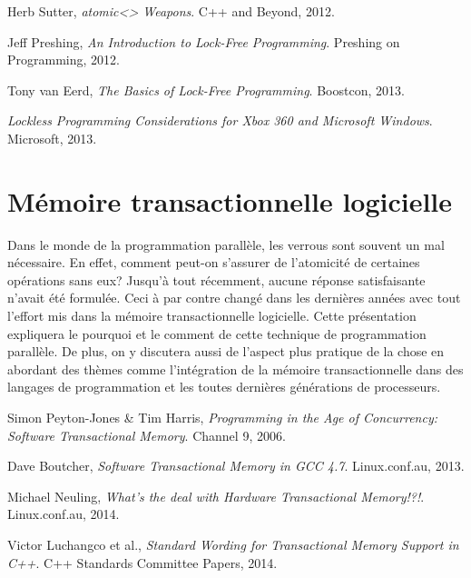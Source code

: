 \documentclass{article}
\begin{document}
\renewcommand\refname{Références LockFree}
\begin{thebibliography}{9}
          Herb Sutter,
          \emph{atomic<> Weapons}.
          C++ and Beyond, 2012.
          
          Jeff Preshing,
          \emph{An Introduction to Lock-Free Programming}.
          Preshing on Programming, 2012.
          
          Tony van Eerd,
          \emph{The Basics of Lock-Free Programming}.
          Boostcon, 2013.
          
          \emph{Lockless Programming Considerations for Xbox 360 and Microsoft Windows}.
          Microsoft, 2013.
\end{thebibliography}

\newpage

\section*{Mémoire transactionnelle logicielle}
Dans le monde de la programmation parallèle, les verrous sont souvent un mal nécessaire. En effet, comment peut-on s'assurer de l'atomicité de certaines opérations sans eux? Jusqu'à tout récemment, aucune réponse satisfaisante n'avait été formulée. Ceci à par contre changé dans les dernières années avec tout l'effort mis dans la mémoire transactionnelle logicielle. Cette présentation expliquera le pourquoi et le comment de cette technique de programmation parallèle. De plus, on y discutera aussi de l'aspect plus pratique de la chose en abordant des thèmes comme l'intégration de la mémoire transactionnelle dans des langages de programmation et les toutes dernières générations de processeurs.

\renewcommand\refname{Références STM}
\begin{thebibliography}{9}
          Simon Peyton-Jones \& Tim Harris,
          \emph{Programming in the Age of Concurrency: Software Transactional Memory}.
          Channel 9, 2006.
          
          Dave Boutcher,
          \emph{Software Transactional Memory in GCC 4.7}.
          Linux.conf.au, 2013.
          
          Michael Neuling,
          \emph{What's the deal with Hardware Transactional Memory!?!}.
          Linux.conf.au, 2014.
          
          Victor Luchangco et al.,
          \emph{Standard Wording for Transactional Memory Support in C++}.
          C++ Standards Committee Papers, 2014.
         
\end{thebibliography}
\end{document}
